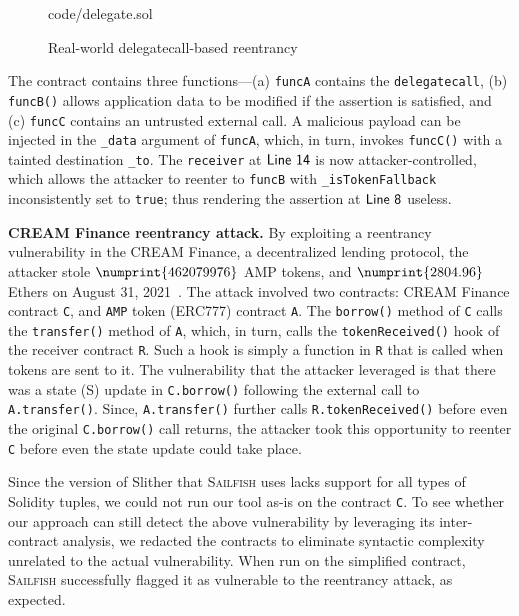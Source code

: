 \documentclass[conference, romanappendices]{tex/IEEEtran}
\theoremstyle{bfnote}
\newcommand{\toolname}{\textsc{Sailfish}\xspace}
\newcommand{\slither}{{\sc Slither}\xspace}
\newcommand{\solidity}{{\sc Solidity}\xspace}
\newcommand{\reentrancy}{{reentrancy}\xspace}
\let\num\numprint
\newcommand{\Line}[1]{\ensuremath{\sf Line~ #1}}
\begin{document}
\begin{figure}[h]
	\vspace{-4mm}
	
	{code/delegate.sol}
	\vspace{-6mm}
	\caption{Real-world delegatecall-based \reentrancy}
	\label{fig:case_study_delegate}
	\vspace{-3mm}
\end{figure}
The contract contains three functions---(a) \texttt{funcA} contains the \texttt{delegatecall},
(b) \texttt{funcB()} allows application data to be modified if the assertion is satisfied, and (c) \texttt{funcC} contains an untrusted external call.
A malicious payload can be injected in the \texttt{\_data} argument of \texttt{funcA}, which, in turn, invokes \texttt{funcC()} with a tainted destination \texttt{\_to}.
The \texttt{receiver} at \Line{14} is now attacker-controlled, which allows the attacker to reenter to \texttt{funcB} with \texttt{\_isTokenFallback} inconsistently set to \texttt{true}; thus rendering the assertion at \Line{8} useless.

\noindent
\textbf{CREAM Finance \reentrancy attack.}
By exploiting a \reentrancy vulnerability in the CREAM Finance, a decentralized lending protocol, the attacker stole $\num{462079976}$ AMP tokens, and $\num{2804.96}$ Ethers on August 31, 2021~\cite{cream}.
The attack involved two contracts: CREAM Finance contract \texttt{C}, and \texttt{AMP} token (ERC777) contract \texttt{A}.
The \texttt{borrow()} method of \texttt{C} calls the \texttt{transfer()} method of \texttt{A}, which, in turn, calls the \texttt{tokenReceived()} hook of the receiver contract \texttt{R}.
Such a hook is simply a function in \texttt{R} that is called when tokens are sent to it.
The vulnerability that the attacker leveraged is that there was a state (S) update in \texttt{C.borrow()} following the external call to \texttt{A.transfer()}.
Since, \texttt{A.transfer()} further calls \texttt{R.tokenReceived()} before even the original \texttt{C.borrow()} call returns, the attacker took this opportunity to reenter \texttt{C} before even the state update could take place.

Since the version of \slither that \toolname uses lacks support for all types of \solidity tuples, we could not run our tool as-is on the contract \texttt{C}.
To see whether our approach can still detect the above vulnerability by leveraging its inter-contract analysis, we redacted the contracts to eliminate syntactic complexity unrelated to the actual vulnerability.
When run on the simplified contract, \toolname successfully flagged it as vulnerable to the \reentrancy attack, as expected.
\end{document}
